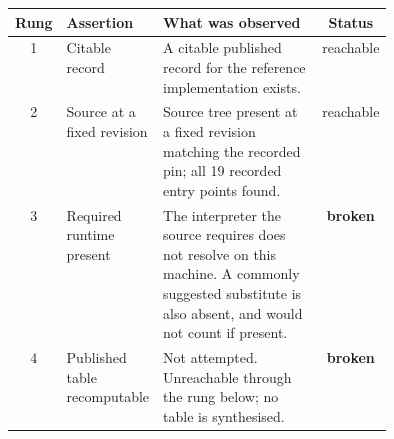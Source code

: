 \begin{tabular}{clp{0.44\linewidth}c}
\toprule
Rung & Assertion & What was observed & Status \\
\midrule
1 & Citable record & A citable published record for the reference implementation exists. & reachable \\
2 & Source at a fixed revision & Source tree present at a fixed revision matching the recorded pin; all 19 recorded
entry points found. & reachable \\
3 & Required runtime present & The interpreter the source requires does not resolve on this machine. A commonly
suggested substitute is also absent, and would not count if present. & \textbf{broken} \\
4 & Published table recomputable & Not attempted. Unreachable through the rung below; no table is synthesised. & \textbf{broken} \\
\bottomrule
\end{tabular}
